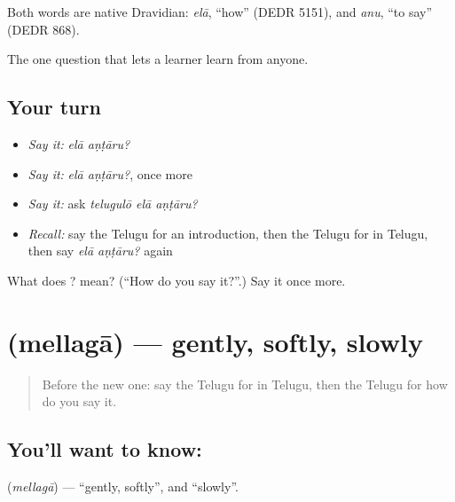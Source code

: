 \begin{cousinweb}
Both words are native Dravidian: \emph{elā}, \textquotedblleft{}how\textquotedblright{} (DEDR 5151), and \emph{anu}, \textquotedblleft{}to say\textquotedblright{} (DEDR 868).
\end{cousinweb}

\begin{grammarlens}[title={What you've built}]
The one question that lets a learner learn from anyone.
\end{grammarlens}

\subsection*{Your turn}
\begin{itemize}
\raggedright
  \item \emph{Say it:} \emph{elā aṇṭāru?}
  \item \emph{Say it:} \emph{elā aṇṭāru?}, once more
  \item \emph{Say it:} ask \emph{telugulō elā aṇṭāru?}
  \item \emph{Recall:} say the Telugu for an introduction, then the Telugu for in Telugu, then say \emph{elā aṇṭāru?} again
\end{itemize}

\begin{tcolorbox}[breakable,colback=teal!4,colframe=teal!35!black,title={Before you move on}]
What does  ? mean? (\textquotedblleft{}How do you say it?\textquotedblright{}.) Say it once more.
\end{tcolorbox}
\section[\texorpdfstring{\te{మెల్లగా} (mellagā)}{మెల్లగా (mellagā)}]{ (mellagā) — gently, softly, slowly}

\label{lesson:TE-C95-gently}



\begin{quote}
Before the new one: say the Telugu for in Telugu, then the Telugu for how do you say it.
\end{quote}

\subsection*{You'll want to know: }
\textbf{} (\emph{mellagā}) — \textquotedblleft{}gently, softly\textquotedblright{}, and \textquotedblleft{}slowly\textquotedblright{}.

